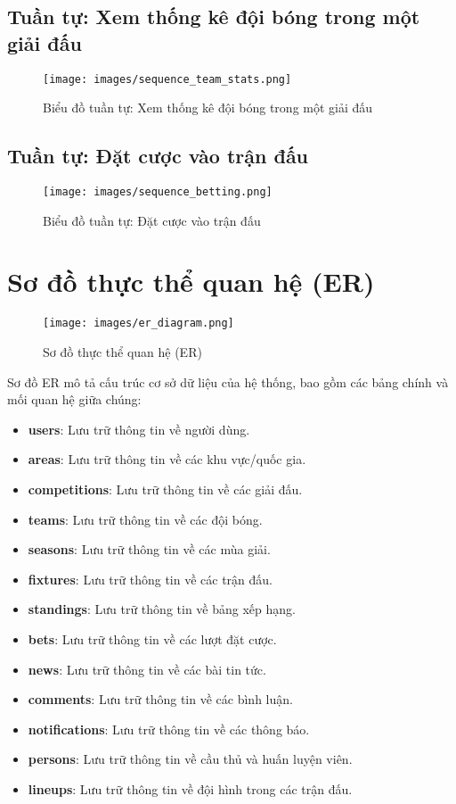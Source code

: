 \documentclass[a4paper,12pt]{report}
\begin{document}
\subsection{Tuần tự: Xem thống kê đội bóng trong một giải đấu}

\begin{figure}[H]
\centering
\texttt{[image: images/sequence\_team\_stats.png]}
\caption{Biểu đồ tuần tự: Xem thống kê đội bóng trong một giải đấu}
\label{fig:sequence-team-stats}
\end{figure}

\subsection{Tuần tự: Đặt cược vào trận đấu}

\begin{figure}[H]
\centering
\texttt{[image: images/sequence\_betting.png]}
\caption{Biểu đồ tuần tự: Đặt cược vào trận đấu}
\label{fig:sequence-betting}
\end{figure}

\section{Sơ đồ thực thể quan hệ (ER)}

\begin{figure}[H]
\centering
\texttt{[image: images/er\_diagram.png]}
\caption{Sơ đồ thực thể quan hệ (ER)}
\label{fig:er-diagram}
\end{figure}

Sơ đồ ER mô tả cấu trúc cơ sở dữ liệu của hệ thống, bao gồm các bảng chính và mối quan hệ giữa chúng:

\begin{itemize}
    \item \textbf{users}: Lưu trữ thông tin về người dùng.
    \item \textbf{areas}: Lưu trữ thông tin về các khu vực/quốc gia.
    \item \textbf{competitions}: Lưu trữ thông tin về các giải đấu.
    \item \textbf{teams}: Lưu trữ thông tin về các đội bóng.
    \item \textbf{seasons}: Lưu trữ thông tin về các mùa giải.
    \item \textbf{fixtures}: Lưu trữ thông tin về các trận đấu.
    \item \textbf{standings}: Lưu trữ thông tin về bảng xếp hạng.
    \item \textbf{bets}: Lưu trữ thông tin về các lượt đặt cược.
    \item \textbf{news}: Lưu trữ thông tin về các bài tin tức.
    \item \textbf{comments}: Lưu trữ thông tin về các bình luận.
    \item \textbf{notifications}: Lưu trữ thông tin về các thông báo.
    \item \textbf{persons}: Lưu trữ thông tin về cầu thủ và huấn luyện viên.
    \item \textbf{lineups}: Lưu trữ thông tin về đội hình trong các trận đấu.
\end{itemize}
\end{document}
